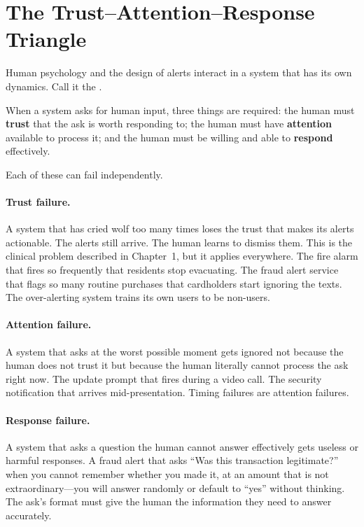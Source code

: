 \section{The Trust--Attention--Response Triangle}
\label{sec:ch05-tar-triangle}

Human psychology and the design of alerts interact in a system that has its own dynamics. Call it the .

When a system asks for human input, three things are required: the human must \textbf{trust} that the ask is worth responding to; the human must have \textbf{attention} available to process it; and the human must be willing and able to \textbf{respond} effectively.

Each of these can fail independently.

\paragraph{Trust failure.} A system that has cried wolf too many times loses the trust that makes its alerts actionable. The alerts still arrive. The human learns to dismiss them. This is the clinical  problem described in Chapter~1, but it applies everywhere. The fire alarm that fires so frequently that residents stop evacuating. The fraud alert service that flags so many routine purchases that cardholders start ignoring the texts. The over-alerting system trains its own users to be non-users.

\paragraph{Attention failure.} A system that asks at the worst possible moment gets ignored not because the human does not trust it but because the human literally cannot process the ask right now. The update prompt that fires during a video call. The security notification that arrives mid-presentation. Timing failures are attention failures.

\paragraph{Response failure.} A system that asks a question the human cannot answer effectively gets useless or harmful responses. A fraud alert that asks ``Was this transaction legitimate?'' when you cannot remember whether you made it, at an amount that is not extraordinary---you will answer randomly or default to ``yes'' without thinking. The ask's format must give the human the information they need to answer accurately.

